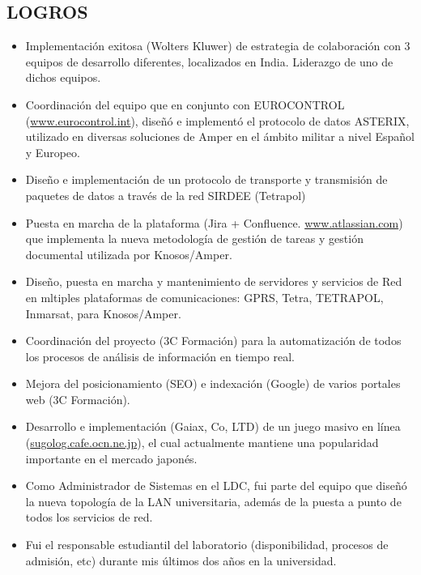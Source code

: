 \documentclass[line,margin]{res}
\begin{document}
\begin{resume}
\section{LOGROS}       
                \begin{itemize}  \itemsep 2pt %
                \item Implementaci\'{o}n exitosa (Wolters Kluwer) de estrategia de colaboraci\'{o}n 
                con 3 equipos de desarrollo diferentes, localizados en India. Liderazgo de uno de dichos equipos.
                \item Coordinaci\'{o}n del equipo que en conjunto con 
                EUROCONTROL (\url{www.eurocontrol.int}), dise\~{n}\'{o} e 
                implement\'{o} el protocolo de datos ASTERIX, utilizado en 
                diversas soluciones de Amper en el \'{a}mbito militar a nivel 
                Espa\~{n}ol y Europeo.
                \item Dise\~{n}o e implementaci\'{o}n de un protocolo de 
                transporte y transmisi\'{o}n de paquetes de datos a trav\'{e}s 
                de la red SIRDEE (Tetrapol)
                \item Puesta en marcha de la plataforma (Jira + Confluence. 
                \url{www.atlassian.com}) que implementa la nueva metodolog\'{i}a 
                de gesti\'{o}n de tareas y gesti\'{o}n documental utilizada por 
                Knosos/Amper.
                \item Dise\~{n}o, puesta en marcha y mantenimiento de servidores 
                y servicios de Red en mltiples plataformas de comunicaciones: 
                GPRS, Tetra, TETRAPOL, Inmarsat, para Knosos/Amper.
                \item Coordinaci\'{o}n del proyecto (3C Formaci\'{o}n) para la 
                automatizaci\'{o}n de todos los procesos de an\'{a}lisis de 
                informaci\'{o}n en tiempo real.
                \item Mejora del posicionamiento (SEO) e indexaci\'{o}n (Google) 
                de varios portales web (3C Formaci\'{o}n).
                \item Desarrollo e implementaci\'{o}n (Gaiax, Co, LTD) de un 
                juego masivo en l\'{i}nea (\url{sugolog.cafe.ocn.ne.jp}), el 
                cual actualmente mantiene una popularidad importante en el 
                mercado japon\'{e}s.
                \item Como Administrador de Sistemas en el LDC, fui parte del 
                equipo que dise\~{n}\'{o} la nueva topolog\'{i}a de la LAN 
                universitaria, adem\'{a}s de la puesta a punto de todos los 
                servicios de red.
                \item Fui el responsable estudiantil del laboratorio (disponibilidad, 
                procesos de admisi\'{o}n, etc) durante mis \'{u}ltimos dos a\~{n}os en 
                la universidad. 
                \end{itemize}


\end{resume}
\end{document}
